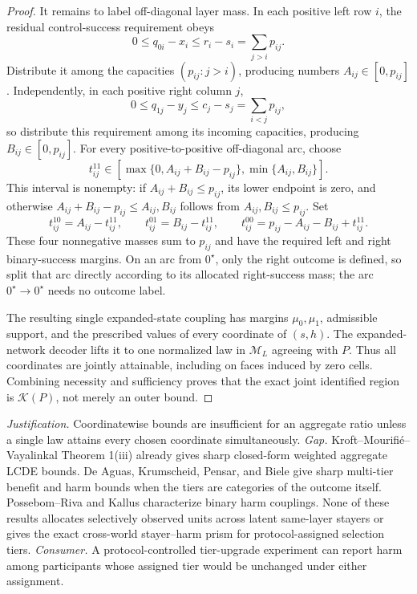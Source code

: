 \documentclass{article}
\begin{document}
\begin{proof}
It remains to label off-diagonal layer mass.  In each positive left row \(i\), the residual control-success requirement obeys
\[
 0\le q_{0i}-x_i\le r_i-s_i=\sum_{j>i}p_{ij}.
\]
Distribute it among the capacities \((p_{ij}:j>i)\), producing numbers \(A_{ij}\in[0,p_{ij}]\).  Independently, in each positive right column \(j\),
\[
 0\le q_{1j}-y_j\le c_j-s_j=\sum_{i<j}p_{ij},
\]
so distribute this requirement among its incoming capacities, producing \(B_{ij}\in[0,p_{ij}]\).  For every positive-to-positive off-diagonal arc, choose
\[
 t_{ij}^{11}\in
 \left[
 \max\{0,A_{ij}+B_{ij}-p_{ij}\},
 \min\{A_{ij},B_{ij}\}
 \right].
\]
This interval is nonempty: if \(A_{ij}+B_{ij}\le p_{ij}\), its lower endpoint is zero, and otherwise
\(A_{ij}+B_{ij}-p_{ij}\le A_{ij},B_{ij}\) follows from \(A_{ij},B_{ij}\le p_{ij}\).  Set
\[
 t_{ij}^{10}=A_{ij}-t_{ij}^{11},\qquad
 t_{ij}^{01}=B_{ij}-t_{ij}^{11},\qquad
 t_{ij}^{00}=p_{ij}-A_{ij}-B_{ij}+t_{ij}^{11}.
\]
These four nonnegative masses sum to \(p_{ij}\) and have the required left and right binary-success margins.  On an arc from \(0^{\star}\), only the right outcome is defined, so split that arc directly according to its allocated right-success mass; the arc \(0^{\star}\to0^{\star}\) needs no outcome label.

The resulting single expanded-state coupling has margins \(\mu_0,\mu_1\), admissible support, and the prescribed values of every coordinate of \((s,h)\).  The expanded-network decoder lifts it to one normalized law in \(\mathcal M_L\) agreeing with \(P\).  Thus all coordinates are jointly attainable, including on faces induced by zero cells.  Combining necessity and sufficiency proves that the exact joint identified region is \(\mathcal K(P)\), not merely an outer bound.
\end{proof}
\par\smallskip\noindent \textit{Justification.} Coordinatewise bounds are insufficient for an aggregate ratio unless a single law attains every chosen coordinate simultaneously. \textit{Gap.} Kroft--Mourifi\'e--Vayalinkal Theorem 1(iii) already gives sharp closed-form weighted aggregate LCDE bounds. De Aguas, Krumscheid, Pensar, and Biele give sharp multi-tier benefit and harm bounds when the tiers are categories of the outcome itself. Possebom--Riva and Kallus characterize binary harm couplings. None of these results allocates selectively observed units across latent same-layer stayers or gives the exact cross-world stayer--harm prism for protocol-assigned selection tiers. \textit{Consumer.} A protocol-controlled tier-upgrade experiment can report harm among participants whose assigned tier would be unchanged under either assignment.
\end{document}
